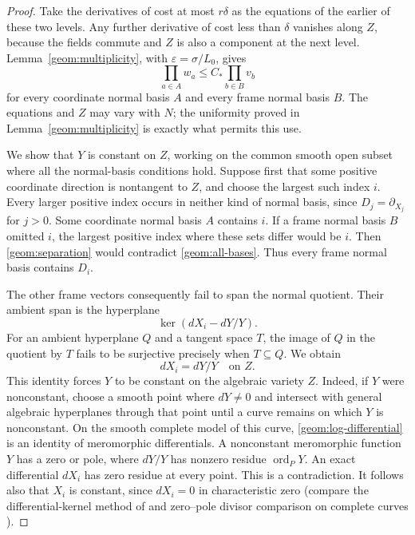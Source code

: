 \begin{proof}
Take the derivatives of cost at most $r\delta$ as the equations of the
earlier of these two levels. Any further derivative of cost less than
$\delta$ vanishes along $Z$, because the fields commute and $Z$ is
also a component at the next level. Lemma~\ref{geom:multiplicity}, with
$\varepsilon=\sigma/L_0$, gives
\begin{equation}
\label{geom:all-bases}
 \prod_{a\in A}w_a\le C_*\prod_{b\in B}v_b
\end{equation}
for every coordinate normal basis $A$ and every frame normal basis $B$.
The equations and $Z$ may vary with $N$; the uniformity proved in
Lemma~\ref{geom:multiplicity} is exactly what permits this use.

We show that $Y$ is constant on $Z$, working on the common smooth open
subset where all the normal-basis conditions hold. Suppose first that
some positive coordinate direction is nontangent to $Z$, and choose the
largest such index $i$. Every larger positive index occurs in neither
kind of normal basis, since $D_j=\partial_{X_j}$ for $j>0$.
Some coordinate normal basis $A$ contains $i$. If a frame normal basis
$B$ omitted $i$, the largest positive index where these sets differ
would be $i$. Then
\eqref{geom:separation} would contradict \eqref{geom:all-bases}.
Thus every frame normal basis contains $D_i$.

The other frame vectors consequently fail to span the normal quotient.
Their ambient span is the hyperplane
\[
 \ker(dX_i-dY/Y).
\]
For an ambient hyperplane $Q$ and a tangent space $T$, the image of
$Q$ in the quotient by $T$ fails to be surjective precisely when
$T\subseteq Q$. We obtain
\begin{equation}
\label{geom:log-differential}
 dX_i=dY/Y\quad\text{on }Z.
\end{equation}
This identity forces $Y$ to be constant on the algebraic variety $Z$.
Indeed, if $Y$ were nonconstant, choose a smooth point where $dY\ne0$
and intersect with general algebraic hyperplanes through that point
until a curve remains on which $Y$ is nonconstant. On the smooth
complete model of this curve, \eqref{geom:log-differential} is an
identity of meromorphic differentials. A nonconstant meromorphic
function $Y$ has a zero or pole, where $dY/Y$ has nonzero residue
$\operatorname{ord}_P Y$. An exact differential $dX_i$ has zero
residue at every point. This is a contradiction. It follows also
that $X_i$ is constant, since $dX_i=0$ in characteristic zero (compare the differential-kernel method of \cite{ax1971} and zero--pole divisor comparison on complete curves \cite{lang1982}).


\end{proof}

